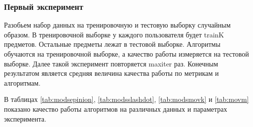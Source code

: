 \documentclass[14pt]{extarticle}
\begin{document}
 
 \subsubsection{Первый эксперимент}
  
 Разобьем набор данных на тренировочную и тестовую выборку случайным образом. В тренировочной выборке у каждого пользователя будет trainK предметов. Остальные предметы лежат в тестовой выборке. Алгоритмы обучаются на тренировочной выборке, а качество работы измеряется на тестовой выборке. Далее такой эксперимент повторяется maxiter раз. Конечным результатом является средняя величина качества работы по метрикам и алгоритмам. 
 
 

 
В таблицах \ref{tab:modsepinion}, \ref{tab:modsslashdot}, \ref{tab:modsmovk} и \ref{tab:movm} показано качество работы алгоритмов на различных данных и параметрах эксперимента.

\begin{table}[H]
\caption{Набор данных Epinion}
\label{tab:modsepinion}
\end{table} 
\end{document}
